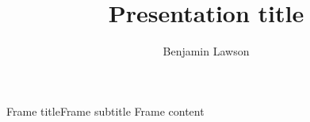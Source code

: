\documentclass[xcolor=dvipsnames]{beamer}
\title{Presentation title}
\author{Benjamin Lawson}
\begin{document}
\begin{frame}
    \titlepage
\end{frame}

\begin{frame}{Frame title}{Frame subtitle}
    Frame content
\end{frame}



\end{document}
